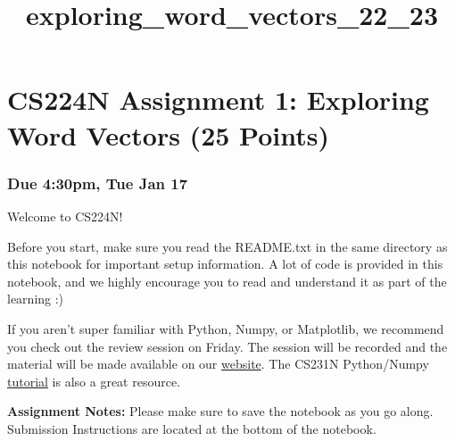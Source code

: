 \documentclass[11pt]{article}
\title{exploring\_word\_vectors\_22\_23}
\begin{document}
\maketitle




\section{CS224N Assignment 1: Exploring Word Vectors (25
  Points)}\label{cs224n-assignment-1-exploring-word-vectors-25-points}

\subsubsection{\texorpdfstring{ Due 4:30pm, Tue Jan 17
    }{ Due 4:30pm, Tue Jan 17 }}\label{due-430pm-tue-jan-17}

Welcome to CS224N!

Before you start, make sure you read the README.txt in the same
directory as this notebook for important setup information. A lot of
code is provided in this notebook, and we highly encourage you to read
and understand it as part of the learning :)

If you aren't super familiar with Python, Numpy, or Matplotlib, we
recommend you check out the review session on Friday. The session will
be recorded and the material will be made available on our
\href{http://web.stanford.edu/class/cs224n/index.html\#schedule}{website}.
The CS231N Python/Numpy
\href{https://cs231n.github.io/python-numpy-tutorial/}{tutorial} is also
a great resource.

\textbf{Assignment Notes:} Please make sure to save the notebook as you
go along. Submission Instructions are located at the bottom of the
notebook.
\end{document}
